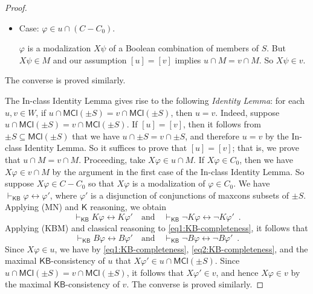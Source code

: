 \documentclass[12pt]{article}
\theoremstyle{definition}
\newcommand{\KB}{{\mathsf{KB}}}                 %
\newcommand{\MCl}{\mathsf{MCl}}                   %
\begin{document}
\begin{proof}
\begin{itemize}
  \item Case: $\varphi\in u\cap(C-C_0)$.

    $\varphi$ is a modalization $X\psi$ of a Boolean combination of
    members of $S$. But $X\psi\in M$ and our assumption $[u]=[v]$
    implies $u\cap M=v\cap M$.  So $X\psi\in v$.
  \end{itemize}
  The converse is proved similarly.

  The In-class Identity Lemma gives rise to the following
  \emph{Identity Lemma\/}: for each $u,v\in W$, if
  $u\cap\MCl(\pm S)=v\cap\MCl(\pm S)$, then $u=v$. Indeed, suppose
  $u\cap\MCl(\pm S)=v\cap\MCl(\pm S)$.  If $[u]=[v]$, then it follows
  from $\pm S\subseteq\MCl(\pm S)$ that we have
  $u\cap\pm S=v\cap\pm S$, and therefore $u=v$ by the In-class
  Identity Lemma. So it suffices to prove that $[u]=[v]$; that is, we
  prove that $u\cap M=v\cap M$.  Proceeding, take
  $X\varphi\in u\cap M$.  If $X\varphi\in C_0$, then we have
  $X\varphi\in v\cap M$ by the argument in the first case of the
  In-class Identity Lemma.  So suppose $X\varphi\in C-C_0$ so that
  $X\varphi$ is a modalization of $\varphi\in C_0$. We have
  $\vdash_\KB\varphi\leftrightarrow\varphi'$, where $\varphi'$ is a
  disjunction of conjunctions of maxcons subsets of $\pm S$.  Applying
  (MN) and $\mathsf{K}$ reasoning, we obtain
  \begin{equation}
    \vdash_\KB K\varphi\leftrightarrow K\varphi' \quad\text{and}\quad
    \vdash_\KB \lnot K\varphi\leftrightarrow \lnot K\varphi'\enspace.
    \label{eq1:KB-completeness}
  \end{equation}
  Applying (KBM) and classical reasoning to
  \eqref{eq1:KB-completeness}, it follows that
  \begin{equation}
    \vdash_\KB B\varphi\leftrightarrow B\varphi' \quad\text{and}\quad
    \vdash_\KB \lnot B\varphi\leftrightarrow \lnot B\varphi'\enspace.
    \label{eq2:KB-completeness}
  \end{equation}
  Since $X\varphi\in u$, we have by \eqref{eq1:KB-completeness},
  \eqref{eq2:KB-completeness}, and the maximal $\KB$-consistency of
  $u$ that $X\varphi'\in u\cap\MCl(\pm S)$.  Since
  $u\cap\MCl(\pm S)=v\cap\MCl(\pm S)$, it follows that
  $X\varphi'\in v$, and hence $X\varphi\in v$ by the maximal
  $\KB$-consistency of $v$.  The converse is proved similarly.


\end{proof}
\end{document}
